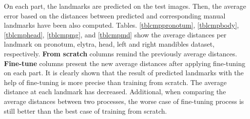 \documentclass[review]{elsarticle}
\begin{document}
On each part, the landmarks are predicted on the test images. Then, the average error based on the distances between predicted and corresponding manual landmarks have been also computed. Tables. \ref{tblcmppronotum}, \ref{tblcmpbody}, \ref{tblcmphead}, \ref{tblcmpmg}, and \ref{tblcmpmd} show the average distances per landmark on pronotum, elytra, head, left and right mandibles dataset, respectively. \textbf{From scratch} columns remind the previously average distances. \textbf{Fine-tune} columns present the new average distances after applying fine-tuning on each part. It is clearly shown that the result of predicted landmarks with the help of fine-tuning is more precise than training from scratch. The average distance at each landmark has decreased. Additional, when comparing the average distances between two processes, the worse case of fine-tuning process is still better than the best case of training from scratch.
\end{document}

